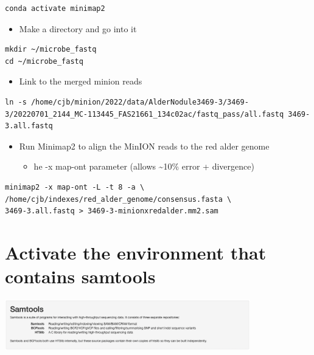 \documentclass[
]{book}
\providecommand{\tightlist}{%
  \setlength{\itemsep}{0pt}\setlength{\parskip}{0pt}}
\begin{document}
\begin{verbatim}
conda activate minimap2
\end{verbatim}

\begin{itemize}
\tightlist
\item
  Make a directory and go into it
\end{itemize}

\begin{verbatim}
mkdir ~/microbe_fastq
cd ~/microbe_fastq
\end{verbatim}

\begin{itemize}
\tightlist
\item
  Link to the merged minion reads
\end{itemize}

\begin{verbatim}
ln -s /home/cjb/minion/2022/data/AlderNodule3469-3/3469-3/20220701_2144_MC-113445_FAS21661_134c02ac/fastq_pass/all.fastq 3469-3.all.fastq
\end{verbatim}

\begin{itemize}
\tightlist
\item
  Run Minimap2 to align the MinION reads to the red alder genome

  \begin{itemize}
  \tightlist
  \item
    he -x map-ont parameter (allows \textasciitilde10\% error + divergence)
  \end{itemize}
\end{itemize}

\begin{verbatim}
minimap2 -x map-ont -L -t 8 -a \
/home/cjb/indexes/red_alder_genome/consensus.fasta \
3469-3.all.fastq > 3469-3-minionxredalder.mm2.sam
\end{verbatim}

\hypertarget{activate-the-environment-that-contains-samtools}{%
\section{Activate the environment that contains samtools}\label{activate-the-environment-that-contains-samtools}}

\includegraphics[width=0.8\textwidth,height=\textheight]{Figures/samtools.png}
\end{document}
